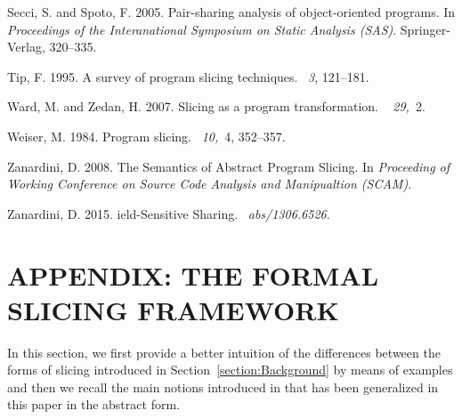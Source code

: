 \documentclass[prodmode,acmtocl]{acmsmall}
\newcommand{\0}{\mbox{\bf 0}}
\begin{document}
\begin{thebibliography}{}
{\sc Secci, S.} {\sc and} {\sc Spoto, F.} 2005.
\newblock Pair-sharing analysis of object-oriented programs.
\newblock In {\em Proceedings of the Interanational Symposium on Static
  Analysis (SAS)}. Springer-Verlag, 320--335.

{\sc Tip, F.} 1995.
\newblock A survey of program slicing techniques.
~{\em 3}, 121--181.

{\sc Ward, M.} {\sc and} {\sc Zedan, H.} 2007.
\newblock Slicing as a program transformation.
~{\em
  29,\/}~2.

{\sc Weiser, M.} 1984.
\newblock Program slicing.
~{\em 10,\/}~4, 352--357.

{\sc Zanardini, D.} 2008.
\newblock The {S}emantics of {A}bstract {P}rogram {S}licing.
\newblock In {\em Proceeding of Working Conference on Source Code Analysis and
  Manipualtion (SCAM)}.

{\sc Zanardini, D.} 2015.
ield-{S}ensitive {S}haring.
~{\em abs/1306.6526}.

\end{thebibliography}

 

\section{APPENDIX: THE FORMAL SLICING FRAMEWORK}
In this section, we first provide a better intuition of the differences between the forms of slicing introduced in Section~\ref{section:Background} by means of examples and then we recall the main notions introduced in \cite{AForm,TheoFoun} that has been generalized in this paper in the abstract form.
\end{document}
